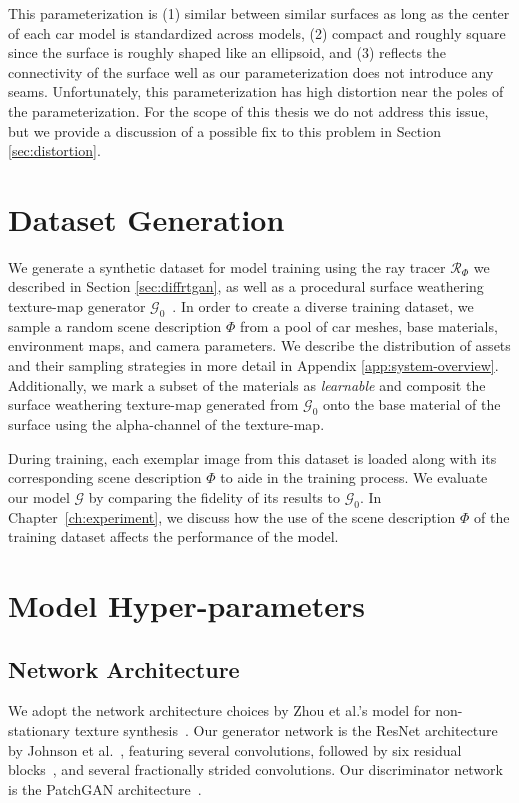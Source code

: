 This parameterization is (1) similar between similar surfaces as long as the center
of each car model is standardized across models, (2) compact and roughly square since the
surface is roughly shaped like an ellipsoid, and (3) reflects the connectivity of the surface
well as our parameterization does not introduce any seams. Unfortunately, this parameterization
has high distortion near the poles of the parameterization. For the scope of this thesis we
do not address this issue, but we provide a discussion of a possible fix to this problem in
Section \ref{sec:distortion}.

\section{Dataset Generation}

We generate a synthetic dataset for model training using the ray tracer $\mathcal{R}_\Phi$
we described in Section \ref{sec:diffrtgan}, as well as a procedural surface weathering
texture-map generator $\mathcal{G}_0$~\cite{bhandari2018procedural}. In order to create a
diverse training dataset, we sample a random scene description $\Phi$ from a pool of car meshes,
base materials, environment maps, and camera parameters. We describe the distribution of assets
and their sampling strategies in more detail in Appendix \ref{app:system-overview}. Additionally,
we mark a subset of the materials as \emph{learnable} and composit the surface weathering
texture-map generated from $\mathcal{G}_0$ onto the base material of the surface using the
alpha-channel of the texture-map.

During training, each exemplar image from this dataset is loaded along with its corresponding
scene description $\Phi$ to aide in the training process. We evaluate our model $\mathcal{G}$
by comparing the fidelity of its results to $\mathcal{G}_0$. In Chapter~\ref{ch:experiment},
we discuss how the use of the scene description $\Phi$ of the training dataset affects the
performance of the model.

\section{Model Hyper-parameters}

\subsection{Network Architecture}

We adopt the network architecture choices by Zhou et al.'s model for non-stationary texture
synthesis~\cite{zhou2018non}. Our generator network is the
ResNet architecture by Johnson et al.~\cite{johnson2016perceptual}, featuring several
convolutions, followed by six residual blocks~\cite{he2016deep}, and several fractionally
strided convolutions. Our discriminator network is the PatchGAN architecture~\cite{isola2017image}.

